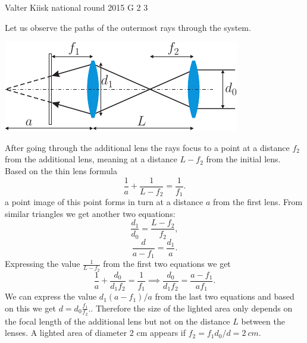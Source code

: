 \documentclass[11pt]{article}
\begin{document}
{Valter Kiisk} %
{national round} %
{2015} %
{G 2} %
{3} %
{

\ifEngSolution
Let us observe the paths of the outermost rays through the system.
\begin{center}
\includegraphics[scale=1.5]{2015-v3g-02-valgustamine-lah}
\end{center}
After going through the additional lens the rays focus to a point at a distance $f_2$ from the additional lens, meaning at a distance $L-f_2$ from the initial lens. Based on the thin lens formula
\begin{equation}
\frac{1}{a}+\frac{1}{L-f_2}=\frac{1}{f_1}.
\end{equation} 
a point image of this point forms in turn at a distance $a$ from the first lens. From similar triangles we get another two equations:
\begin{equation}
\frac{d_1}{d_0}=\frac{L-f_2}{f_2},
\end{equation} 
\begin{equation}
\frac{d}{a-f_1}=\frac{d_1}{a}.
\end{equation}
Expressing the value $\frac{1}{L-f_2}$ from the first two equations we get
\begin{equation}
\frac{1}{a}+\frac{d_0}{d_1f_2}=\frac{1}{f_1}\implies \frac{d_0}{d_1f_2}=\frac{a-f_1}{af_1}.
\end{equation} 
We can express the value $d_1(a-f_1)/a$ from the last two equations and based on this we get $d=d_0\frac{f_1}{f_2}.$. Therefore the size of the lighted area only depends on the focal length of the additional lens but not on the distance $L$ between the lenses. A lighted area of diameter 2 cm appears if $f_2=f_1d_0/d=\SI{2}{cm}$.
\fi
}
\end{document}
